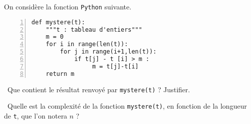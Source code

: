 On considère la fonction \texttt{Python} suivante. 
\begin{Verbatim}[gobble=0,numbers=left]
def mystere(t):
    """t : tableau d'entiers"""
    m = 0
    for i in range(len(t)):
        for j in range(i+1,len(t)):
            if t[j] - t [i] > m :
                 m = t[j]-t[i]
    return m
\end{Verbatim}

\medskip

\question\ Que contient le résultat renvoyé par \texttt{mystere(t)} ? Justifier. 

\medskip

\question\ Quelle est la complexité de la fonction \texttt{mystere(t)}, en fonction de la longueur de \texttt{t}, que l'on notera $n$ ? 